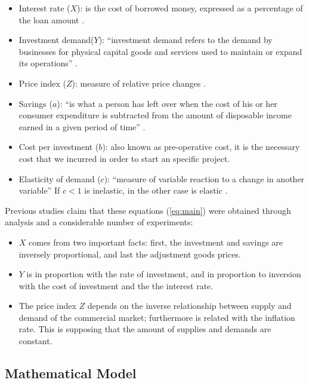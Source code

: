    \begin{itemize}
    \item Interest rate ($X$): is the cost of borrowed money, expressed as a percentage of the loan amount \cite{interestRate}.
    \item Investment demand($Y$): ``investment demand refers to the demand by businesses for physical capital goods and services used to maintain or expand its operations'' \cite{investmentDemand}.
    \item Price index ($Z$): measure of relative price changes \cite{priceIndex}.
    \item Savings ($a$): ``is what a person has left over when the cost of his or her consumer expenditure is subtracted from the amount of disposable income earned in a given period of time'' \cite{savings}.
    \item Cost per investment ($b$): also known as pre-operative cost, it is the necessary cost that we incurred in order to start an specific project.
    \item Elasticity of demand ($c$): ``measure of variable reaction to a change in another variable'' If  $c < 1$ is inelastic, in the other case is elastic \cite{elasticity}.
    \end{itemize}

	Previous studies claim that these equations (\ref{eq:main}) were obtained through analysis and a considerable number of experiments:
    \begin{itemize}
    \item $X$ comes from two important facts: first, the investment and savings are inversely proportional, and last the adjustment goods prices.
    \item $Y$ is in proportion with the rate of investment, and in proportion to inversion with the cost of investment and the the interest rate.
    \item The price index $Z$ depends on the inverse relationship between supply and demand of the commercial market; furthermore is related with the inflation rate. This is supposing that the amount of supplies and demands are constant\cite{jun2001study}. 
    \end{itemize}

	\subsection{Mathematical Model}
    
